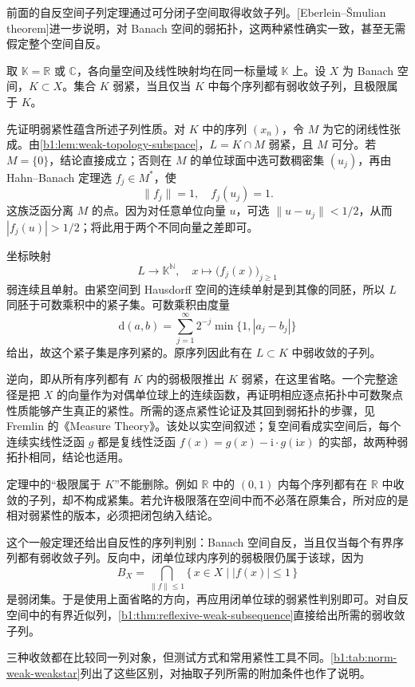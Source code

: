 前面的自反空间子列定理通过可分闭子空间取得收敛子列。[Eberlein--Šmulian theorem]进一步说明，对 Banach 空间的弱拓扑，这两种紧性确实一致，甚至无需假定整个空间自反。

\begin{theorem}\label{b1:thm:eberlein-smulian}
取 \(\mathbb K=\mathbb R\) 或 \(\mathbb C\)，各向量空间及线性映射均在同一标量域 \(\mathbb K\) 上。设 \(X\) 为 Banach 空间，\(K\subset X\)。集合 \(K\) 弱紧，当且仅当 \(K\) 中每个序列都有弱收敛子列，且极限属于 \(K\)。
\end{theorem}

\begin{proofsketch}
先证明弱紧性蕴含所述子列性质。对 \(K\) 中的序列 \((x_n)\)，令 \(M\) 为它的闭线性张成。由\cref{b1:lem:weak-topology-subspace}，\(L=K\cap M\) 弱紧，且 \(M\) 可分。若 \(M=\{0\}\)，结论直接成立；否则在 \(M\) 的单位球面中选可数稠密集 \((u_j)\)，再由 Hahn--Banach 定理选 \(f_j\in M^*\)，使
\[
 \|f_j\|=1,\quad f_j(u_j)=1.
\]
这族泛函分离 \(M\) 的点。因为对任意单位向量 \(u\)，可选 \(\|u-u_j\|<1/2\)，从而 \(|f_j(u)|>1/2\)；将此用于两个不同向量之差即可。

坐标映射
\[
 L\longrightarrow\mathbb K^{\mathbb N},
 \quad x\longmapsto\bigl(f_j(x)\bigr)_{j\ge1}
\]
弱连续且单射。由紧空间到 Hausdorff 空间的连续单射是到其像的同胚，所以 \(L\) 同胚于可数乘积中的紧子集。可数乘积由度量
\[
 \mathrm{d}(a,b)=\sum_{j=1}^{\infty}2^{-j}\min\{1,|a_j-b_j|\}
\]
给出，故这个紧子集是序列紧的。原序列因此有在 \(L\subset K\) 中弱收敛的子列。

逆向，即从所有序列都有 \(K\) 内的弱极限推出 \(K\) 弱紧，在这里省略。一个完整途径是把 \(X\) 的向量作为对偶\WeakStar{}单位球上的连续函数，再证明相应逐点拓扑中可数聚点性质能够产生真正的紧性。所需的逐点紧性论证及其回到弱拓扑的步骤，见 Fremlin 的《Measure Theory》\cite[Volume 4, 462B(c) and 462C--D]{Fremlin2016Measure}。该处以实空间叙述；复空间看成实空间后，每个连续实线性泛函 \(g\) 都是复线性泛函 \(f(x)=g(x)-\mathrm i \cdot g(\mathrm i x)\) 的实部，故两种弱拓扑相同，结论也适用。
\end{proofsketch}

定理中的“极限属于 \(K\)”不能删除。例如 \(\mathbb R\) 中的 \((0,1)\) 内每个序列都有在 \(\mathbb R\) 中收敛的子列，却不构成紧集。若允许极限落在空间中而不必落在原集合，所对应的是相对弱紧性的版本，必须把闭包纳入结论。

\ProseParagraphBreak

这个一般定理还给出自反性的序列判别：Banach 空间自反，当且仅当每个有界序列都有弱收敛子列。反向中，闭单位球内序列的弱极限仍属于该球，因为
\[
 B_X=\bigcap_{\|f\|\le1}\{\,x\in X\mid |f(x)|\le1\,\}
\]
是弱闭集。于是使用上面省略的方向，再应用闭单位球的弱紧性判别即可。对自反空间中的有界近似列，\cref{b1:thm:reflexive-weak-subsequence}直接给出所需的弱收敛子列。

\ProseParagraphBreak

三种收敛都在比较同一列对象，但测试方式和常用紧性工具不同。\cref{b1:tab:norm-weak-weakstar}列出了这些区别，对抽取子列所需的附加条件也作了说明。

